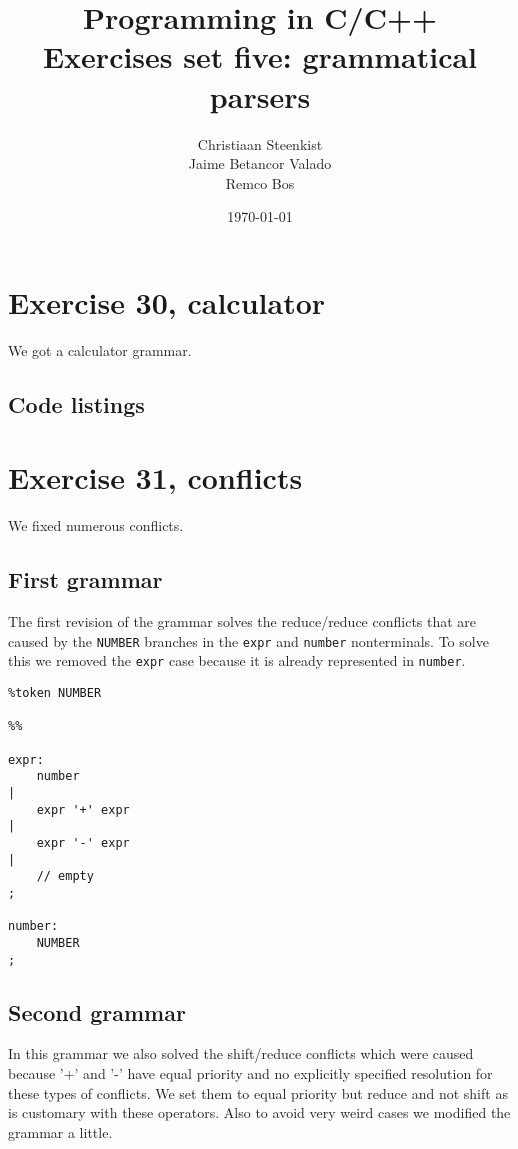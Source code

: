 \documentclass[11pt]{article}
\begin{document}
\title{Programming in C/C++ \\
       Exercises set five: grammatical parsers
}
\date{\today}
\author{Christiaan Steenkist \\
Jaime Betancor Valado \\
Remco Bos \\
}

\maketitle
\section*{Exercise 30, calculator}
We got a calculator grammar.

\subsection*{Code listings}


\section*{Exercise 31, conflicts}
We fixed numerous conflicts.

\subsection*{First grammar}
The first revision of the grammar solves the reduce/reduce conflicts that are caused by the \texttt{NUMBER} branches in the \texttt{expr} and \texttt{number} nonterminals. To solve this we removed the \texttt{expr} case because it is already represented in \texttt{number}.

\begin{lstlisting}
%token NUMBER

%%

expr:
    number
|
    expr '+' expr
|
    expr '-' expr
|
	// empty
;

number:
    NUMBER
;
\end{lstlisting}

\subsection*{Second grammar}
In this grammar we also solved the shift/reduce conflicts which were caused because '+' and '-' have equal priority and no explicitly specified resolution for these types of conflicts. We set them to equal priority but reduce and not shift as is customary with these operators. Also to avoid very weird cases we modified the grammar a little.
\end{document}
